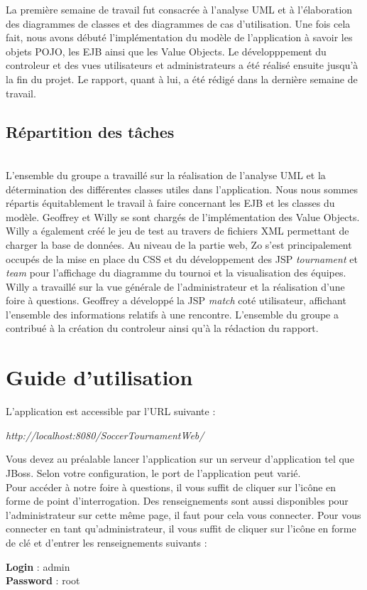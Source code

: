 \documentclass[10pt]{report}
\begin{document}
La première semaine de travail fut consacrée à l'analyse UML et à l'élaboration des diagrammes de classes et des diagrammes de cas d'utilisation. Une fois cela fait, nous avons débuté l'implémentation du modèle de l'application à savoir les objets POJO, les EJB ainsi que les Value Objects. Le développpement du controleur et des vues utilisateurs et administrateurs a été réalisé ensuite jusqu'à la fin du projet. Le rapport, quant à lui, a été rédigé dans la dernière semaine de travail.\\

\section{Répartition des tâches}
~\\

L'ensemble du groupe a travaillé sur la réalisation de l'analyse UML et la détermination des différentes classes utiles dans l'application. Nous nous sommes répartis équitablement le travail à faire concernant les EJB et les classes du modèle. Geoffrey et Willy se sont chargés de l'implémentation des Value Objects. Willy a également créé le jeu de test au travers de fichiers XML permettant de charger la base de données. Au niveau de la partie web, Zo s'est principalement occupés de la mise en place du CSS et du développement des JSP \textit{tournament} et \textit{team} pour l'affichage du diagramme du tournoi et la visualisation des équipes. Willy a travaillé sur la vue générale de l'administrateur et la réalisation d'une foire à questions. Geoffrey a développé la JSP \textit{match} coté utilisateur, affichant l'ensemble des informations relatifs à une rencontre. L'ensemble du groupe a contribué à la création du controleur ainsi qu'à la rédaction du rapport.
  
\chapter{Guide d'utilisation}


L'application est accessible par l'URL suivante :
\begin{center}
\textit{http://localhost:8080/SoccerTournamentWeb/}
\end{center}

Vous devez au préalable lancer l'application sur un serveur d'application tel que JBoss. Selon votre configuration, le port de l'application peut varié.
\\

Pour accéder à notre foire à questions, il vous suffit de cliquer sur l'icône en forme de point d'interrogation. Des renseignements sont aussi disponibles pour l'administrateur sur cette même page, il faut pour cela vous connecter.
Pour vous connecter en tant qu'administrateur, il vous suffit de cliquer sur l'icône en forme de clé et d'entrer les renseignements suivants :
\begin{center}
\textbf{Login} : admin
\\
\textbf{Password} : root 
\end{center}
\end{document}
